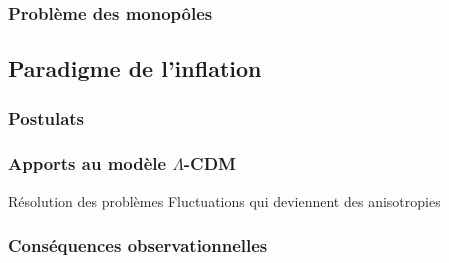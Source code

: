 \subsubsection{Problème des monopôles}

\subsection{Paradigme de l'inflation}
\subsubsection{Postulats}
\subsubsection{Apports au modèle $\Lambda$-CDM}
Résolution des problèmes
Fluctuations qui deviennent des anisotropies

\subsubsection{Conséquences observationnelles}
